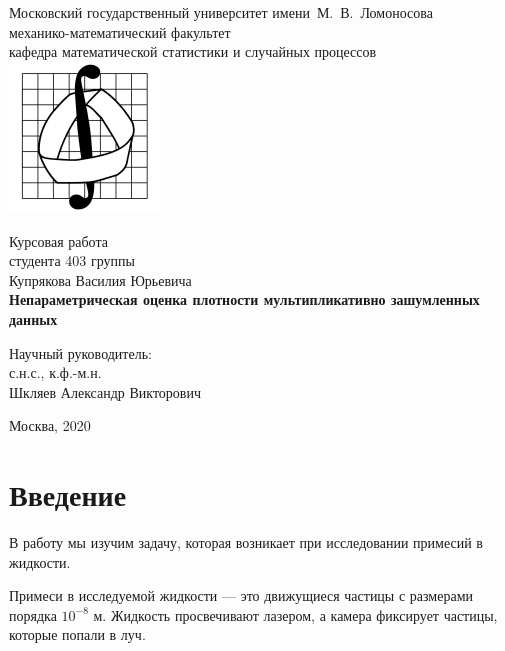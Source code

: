 \documentclass[12pt, a4paper]{report}
\begin{document}
%
\thispagestyle{empty}
\sloppy
\begin{titlepage}
\begin{center}
Московский государственный университет имени~М.~В.~Ломоносова\\
механико-математический факультет\\
кафедра математической статистики и случайных процессов\\

\centering
\includegraphics[width=0.3\textwidth]{mechmath.jpg}

\vspace*{100pt} Курсовая работа\\студента 403 группы \\
Купрякова Василия Юрьевича
\\
\vspace{10pt} {\Large{\textbf{Непараметрическая оценка плотности мультипликативно зашумленных данных}}\\}

\vspace*{40pt}

\begin{flushright}
Научный руководитель:\\ с.н.с., к.ф.-м.н.\\  Шкляев Александр Викторович\\
\end{flushright}

\vspace*{\fill} Москва, 2020
\end{center}
\end{titlepage}
\clearpage
%
\tableofcontents
%
\chapter{Введение}
В работу мы изучим задачу, которая возникает при исследовании примесий в жидкости.

Примеси в исследуемой жидкости --- это движущиеся частицы с размерами порядка $10^{-8}$ м.
Жидкость просвечивают лазером, а камера фиксирует частицы, которые попали в луч.
\end{document}
